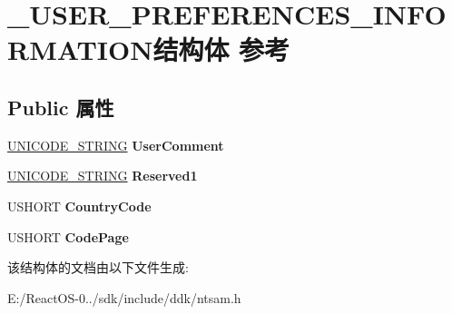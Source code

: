 \hypertarget{struct___u_s_e_r___p_r_e_f_e_r_e_n_c_e_s___i_n_f_o_r_m_a_t_i_o_n}{}\section{\+\_\+\+U\+S\+E\+R\+\_\+\+P\+R\+E\+F\+E\+R\+E\+N\+C\+E\+S\+\_\+\+I\+N\+F\+O\+R\+M\+A\+T\+I\+O\+N结构体 参考}
\label{struct___u_s_e_r___p_r_e_f_e_r_e_n_c_e_s___i_n_f_o_r_m_a_t_i_o_n}
\subsection*{Public 属性}
\begin{DoxyCompactItemize}
\item 
\mbox{\label{struct___u_s_e_r___p_r_e_f_e_r_e_n_c_e_s___i_n_f_o_r_m_a_t_i_o_n_a58b1a636ec49b9e82f89139bf37b9f14}} 
\hyperlink{struct___u_n_i_c_o_d_e___s_t_r_i_n_g}{U\+N\+I\+C\+O\+D\+E\+\_\+\+S\+T\+R\+I\+NG} {\bfseries User\+Comment}
\item 
\mbox{\label{struct___u_s_e_r___p_r_e_f_e_r_e_n_c_e_s___i_n_f_o_r_m_a_t_i_o_n_a38eab4dd85d06f826567b77cfeb6b5fa}} 
\hyperlink{struct___u_n_i_c_o_d_e___s_t_r_i_n_g}{U\+N\+I\+C\+O\+D\+E\+\_\+\+S\+T\+R\+I\+NG} {\bfseries Reserved1}
\item 
\mbox{\label{struct___u_s_e_r___p_r_e_f_e_r_e_n_c_e_s___i_n_f_o_r_m_a_t_i_o_n_adbca58f74f598063249aa3972e904819}} 
U\+S\+H\+O\+RT {\bfseries Country\+Code}
\item 
\mbox{\label{struct___u_s_e_r___p_r_e_f_e_r_e_n_c_e_s___i_n_f_o_r_m_a_t_i_o_n_a3a6dbdafce8ab8b946cecf7dad875746}} 
U\+S\+H\+O\+RT {\bfseries Code\+Page}
\end{DoxyCompactItemize}


该结构体的文档由以下文件生成\+:\begin{DoxyCompactItemize}
\item 
E\+:/\+React\+O\+S-\/0../sdk/include/ddk/ntsam.\+h\end{DoxyCompactItemize}
